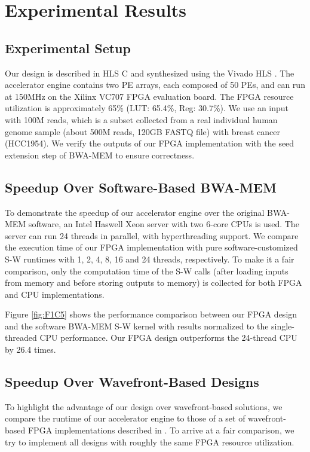 \section{Experimental Results} 
\label{sec:results}

\subsection{Experimental Setup}

Our design is described in HLS C and synthesized using the Vivado HLS \cite{HLS2011}.
The accelerator engine contains two PE arrays, each composed of 50 PEs, and can run at 150MHz on the Xilinx VC707 FPGA evaluation board.
The FPGA resource utilization is approximately 65\% (LUT: 65.4\%, Reg: 30.7\%). 
We use an input with 100M reads, which is a subset collected from a real individual human genome sample (about 500M reads, 120GB FASTQ file) with breast cancer (HCC1954). 
We verify the outputs of our FPGA implementation with the seed extension step of BWA-MEM to ensure correctness. 

\subsection{Speedup Over Software-Based BWA-MEM}

To demonstrate the speedup of our accelerator engine over the original BWA-MEM software, 
an Intel Haswell Xeon server with two 6-core CPUs is used.
The server can run 24 threads in parallel, with hyperthreading support.
We compare the execution time of our FPGA implementation with pure software-customized S-W runtimes with 1, 2, 4, 8, 16 and 24 threads, respectively.
To make it a fair comparison, only the computation time of the S-W calls (after loading inputs from memory and before storing outputs to memory) is collected for both FPGA and CPU implementations.

Figure \ref{fig:F1C5} shows the performance comparison between our FPGA design and the software BWA-MEM S-W kernel with results normalized to the single-threaded CPU performance.
Our FPGA design outperforms the 24-thread CPU by 26.4 times.

\subsection{Speedup Over Wavefront-Based Designs}

To highlight the advantage of our design over wavefront-based solutions, 
we compare the runtime of our accelerator engine to those of a set of wavefront-based FPGA implementations described in \cite{Zhang2007}. To arrive at a fair comparison, we try to implement all designs with roughly the same FPGA resource utilization.

